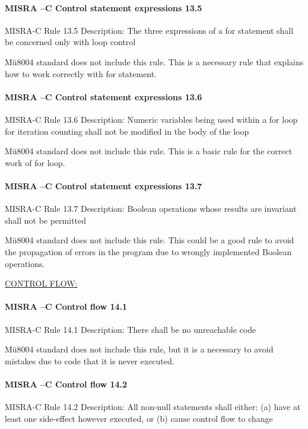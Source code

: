 \paragraph{MISRA –C Control statement expressions 13.5}
MISRA-C Rule 13.5 Description: The three expressions of a for statement shall be concerned only with loop control

Mü8004 standard does not include this rule. This is a necessary rule that explains how to work correctly with for statement.

\paragraph{MISRA –C Control statement expressions 13.6}
MISRA-C Rule 13.6 Description: Numeric variables being used within a for loop for iteration counting shall not be modified in the body of the loop

Mü8004 standard does not include this rule. This is a basic rule for the correct work of for loop.

\paragraph{MISRA –C Control statement expressions 13.7}
MISRA-C Rule 13.7 Description: Boolean operations whose results are invariant shall not be permitted

Mü8004 standard does not include this rule. This could be a good rule to avoid the propagation of errors in the program due to wrongly implemented Boolean operations.


\begin{center}
\textsc{\underline{CONTROL FLOW:}}
\end{center}

\paragraph{MISRA –C Control flow 14.1}
MISRA-C Rule 14.1 Description: There shall be no unreachable code

Mü8004 standard does not include this rule, but it is a necessary to avoid mistakes due to code that it is never executed.

\paragraph{MISRA –C Control flow 14.2}
MISRA-C Rule 14.2 Description: All non-null statements shall either: (a) have at least one side-effect however executed, or (b) cause control flow to change

